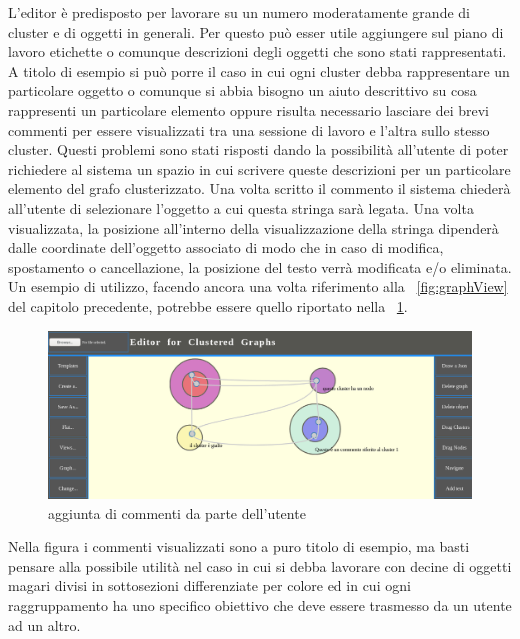 {L'editor è predisposto per lavorare su un numero moderatamente grande di cluster e di oggetti in generali. Per questo può esser utile aggiungere sul piano di lavoro etichette o comunque descrizioni degli oggetti che sono stati rappresentati. A titolo di esempio si può porre il caso in cui ogni cluster debba rappresentare un particolare oggetto o comunque si abbia bisogno un aiuto descrittivo su cosa rappresenti un particolare elemento oppure risulta necessario lasciare dei brevi commenti per essere visualizzati tra una sessione di lavoro e l'altra sullo stesso cluster. Questi problemi sono stati risposti dando la possibilità all'utente di poter richiedere al sistema un spazio in cui scrivere queste descrizioni per un particolare elemento del grafo clusterizzato. Una volta scritto il commento il sistema chiederà all'utente di selezionare l'oggetto a cui questa stringa sarà legata. Una volta visualizzata, la posizione all'interno della visualizzazione della stringa dipenderà dalle coordinate dell'oggetto associato di modo che in caso di modifica, spostamento o cancellazione, la posizione del testo verrà modificata e/o eliminata.\\
Un esempio di utilizzo, facendo ancora una volta riferimento alla \figurename~\ref{fig:graphView} del capitolo precedente, potrebbe essere quello riportato nella \figurename~\ref{fig:addText}.\\
\begin{figure}[!htb]
	\begin{center}
		\includegraphics[width=1 \linewidth]{figure/addText}
	\end{center}
	\caption{aggiunta di commenti da parte dell'utente\label{fig:addText}}
\end{figure}
\newline
Nella figura i commenti visualizzati sono a puro titolo di esempio, ma basti pensare alla possibile utilità nel caso in cui si debba lavorare con decine di oggetti magari divisi in sottosezioni differenziate per colore ed in cui ogni raggruppamento ha uno specifico obiettivo che deve essere trasmesso da un utente ad un altro.
}
